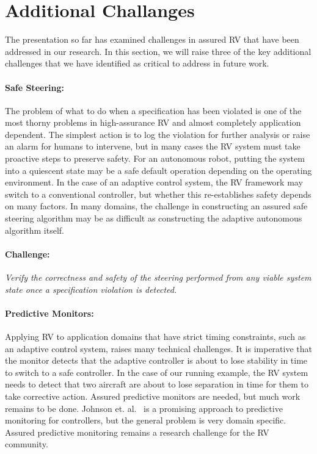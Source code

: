 \section{Additional Challanges }\label{sec:future} 
The presentation so far has examined challenges in assured RV that
have been addressed in our research. In this section, we will
raise three of the key additional challenges that we have identified
as critical to address in future work.

\paragraph{Safe Steering:} The problem of what to do when a
specification has been violated is one of the most thorny problems in
high-assurance RV and almost completely application dependent. The
simplest action is to log the violation for further analysis or raise
an alarm for humans to intervene, but in many cases the RV system must
take proactive steps to preserve safety. For an autonomous robot,
putting the system into a quiescent state may be a safe default
operation depending on the operating environment.  In the case of an
adaptive control system, the RV framework may switch to a conventional
controller, but whether this re-establishes safety depends on many
factors.  In many domains, the challenge in constructing an assured
safe steering algorithm may be as difficult as constructing the
adaptive autonomous algorithm itself.

\paragraph{Challenge:}  \emph{Verify the correctness and safety of the
steering performed  from any viable system state once a specification violation is detected.}
 

\paragraph{Predictive Monitors:} Applying RV to application domains
that have strict timing constraints, such as an adaptive control
system, raises many technical challenges.  It is imperative that the
monitor detects that the adaptive controller is about to lose
stability in time to switch to a safe controller. In the case of our
running example, the RV system needs to detect that two aircraft are
about to lose separation in time for them to take corrective action.
Assured predictive monitors are needed, but much work remains to be
done.  Johnson et. al.~\cite{johnson2015tecs} is a promising approach
to predictive monitoring for controllers, but the general problem is
very domain specific. Assured predictive monitoring remains a research
challenge for the RV community.

